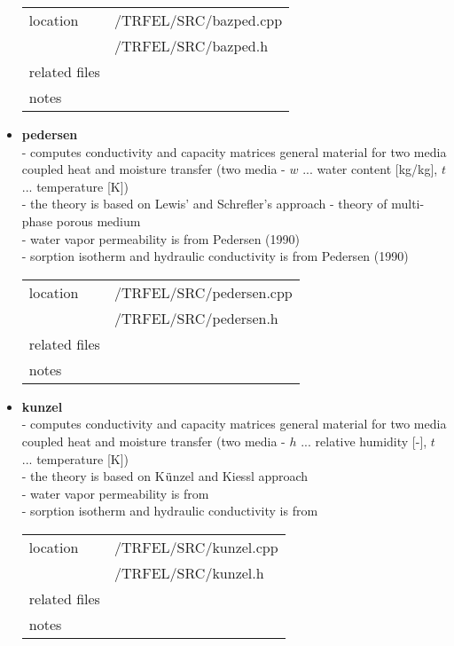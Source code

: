 \begin{itemize}
\begin{center}
\begin{tabular}{|l|l|}
\hline
location & /TRFEL/SRC/bazped.cpp\\
         & /TRFEL/SRC/bazped.h
\\ \hline
related files &
\\ \hline
notes & 
\\ \hline
\end{tabular}
\end{center}

\item{\bf pedersen}\\ 
- computes conductivity and capacity matrices general material for two media coupled heat and moisture transfer (two media - $w$ ... water content [kg/kg], $t$ ... temperature [K])\\
- the theory is based on Lewis' and Schrefler's approach - theory of multi-phase porous medium\\
- water vapor permeability is from Pedersen (1990)~\cite{pedersen}\\
- sorption isotherm and hydraulic conductivity is from Pedersen (1990)~\cite{pedersen}

\begin{center}
\begin{tabular}{|l|l|}
\hline
location & /TRFEL/SRC/pedersen.cpp\\
         & /TRFEL/SRC/pedersen.h
\\ \hline
related files &
\\ \hline
notes & 
\\ \hline
\end{tabular}
\end{center}

\item{\bf kunzel}\\ 
- computes conductivity and capacity matrices general material for two media coupled heat and moisture transfer (two media - $h$ ... relative humidity [-], $t$ ... temperature [K])\\
- the theory is based on K${\rm\ddot{u}}$nzel and Kiessl approach~\cite{kunzel}\\
- water vapor permeability is from\\
- sorption isotherm and hydraulic conductivity is from

\begin{center}
\begin{tabular}{|l|l|}
\hline
location & /TRFEL/SRC/kunzel.cpp\\
         & /TRFEL/SRC/kunzel.h
\\ \hline
related files &
\\ \hline
notes & 
\\ \hline
\end{tabular}
\end{center}


\end{itemize}
